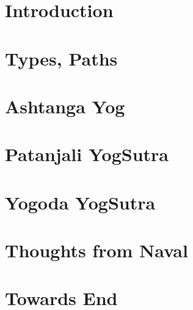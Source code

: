 \section[Intro]{Introduction}


\section[Types]{Types, Paths}


\section[Ashtanga]{Ashtanga Yog}











\section[Patanjali]{Patanjali YogSutra}






\section[Yogoda]{Yogoda YogSutra}


\section[Naval]{Thoughts from Naval}


\section[End]{Towards End}
